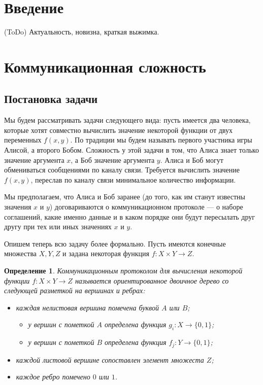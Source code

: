 \documentclass[a4paper]{article}
\newtheorem*{mdefinition}{Определение}
\begin{document}
\newpage

\tableofcontents

\newpage
 
\newpage


\setcounter{section}{0}
\section*{Введение}
(ToDo) Актуальность, новизна, краткая выжимка.

\addtocounter{section}{1}
\section*{Коммуникационная сложность}
\setcounter{subsection}{0}

\subsection{Постановка задачи}
Мы будем рассматривать задачи следующего вида: пусть имеется два человека, которые хотят совместно
вычислить значение некоторой функции от двух переменных $f(x, y)$. По традиции мы будем называть
первого участника игры Алисой, а второго Бобом. Сложность у этой задачи в том, что Алиса знает только
значение аргумента $x$, а Боб значение аргумента $y$. Алиса и Боб могут обмениваться сообщениями 
по каналу связи. Требуется вычислить значение $f(x, y)$, переслав по каналу связи минимальное
количество информации.

Мы предполагаем, что Алиса и Боб заранее (до того, как им станут известны значения $x$ и $y$)
договариваются о коммуникационном протоколе --- о наборе соглашений, какие именно данные и
в каком порядке они будут пересылать друг другу при тех или иных значениях $x$ и $y$.

Опишем теперь всю задачу более формально. Пусть имеются конечные множества $X, Y, Z$ и задана
некоторая функция $f:X\times Y\rightarrow Z$.

\begin{mdefinition}
    Коммуникационным протоколом для вычисления некоторой функции $f:X\times Y\rightarrow Z$ называется
    ориентированное двоичное дерево со следующей разметкой на вершинах и ребрах:
    \begin{itemize}[noitemsep]
        \item каждая нелистовая вершина помечена буквой $A$ или $B$;
        \begin{itemize}[noitemsep]
			\item у вершин с пометкой $A$ определена функция $g_i:X\rightarrow \{0,1\}$;
			\item у вершин с пометкой $B$ определена функция $f_j:Y\rightarrow \{0,1\}$;
        \end{itemize}
        \item каждой листовой вершине сопоставлен элемент множеста $Z$;
        \item каждое ребро помечено $0$ или $1$.

    \end{itemize}
\end{mdefinition}
\end{document}
